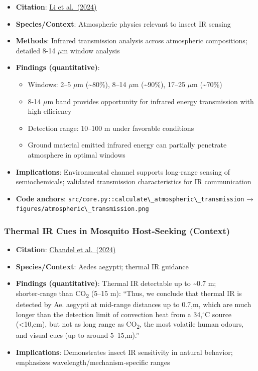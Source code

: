 \documentclass[
  13pt,
  a4paperpaper,
  12pt]{article}
\newcommand{\passthrough}[1]{#1}
\providecommand{\tightlist}{%
  \setlength{\itemsep}{0pt}\setlength{\parskip}{0pt}}
\begin{document}
\begin{itemize}
\tightlist
\item
  \textbf{Citation}:
  \href{https://pmc.ncbi.nlm.nih.gov/articles/PMC11193785/}{Li et
  al.~(2024)}
\item
  \textbf{Species/Context}: Atmospheric physics relevant to insect IR
  sensing
\item
  \textbf{Methods}: Infrared transmission analysis across atmospheric
  compositions; detailed 8-14 \(\mu\mathrm{m}\) window analysis
\item
  \textbf{Findings (quantitative)}:

  \begin{itemize}
  \tightlist
  \item
    Windows: 2--5 \(\mu\mathrm{m}\) (\textasciitilde80\%), 8--14
    \(\mu\mathrm{m}\) (\textasciitilde90\%), 17--25 \(\mu\mathrm{m}\)
    (\textasciitilde70\%)
  \item
    8-14 \(\mu\mathrm{m}\) band provides opportunity for infrared energy
    transmission with high efficiency
  \item
    Detection range: 10--100 m under favorable conditions
  \item
    Ground material emitted infrared energy can partially penetrate
    atmosphere in optimal windows
  \end{itemize}
\item
  \textbf{Implications}: Environmental channel supports long‑range
  sensing of semiochemicals; validated transmission characteristics for
  IR communication
\item
  \textbf{Code anchors}:
  \passthrough{\lstinline!src/core.py::calculate\_atmospheric\_transmission!}
  →
  \passthrough{\lstinline!figures/atmospheric\_transmission.png!}
\end{itemize}

\subsubsection{Thermal IR Cues in Mosquito Host‑Seeking
(Context)}\label{thermal-ir-cues-in-mosquito-hostseeking-context}

\begin{itemize}
\tightlist
\item
  \textbf{Citation}:
  \href{https://www.nature.com/articles/s41586-024-07848-5}{Chandel et
  al.~(2024)}
\item
  \textbf{Species/Context}: Aedes aegypti; thermal IR guidance
\item
  \textbf{Findings (quantitative)}: Thermal IR detectable up to
  \textasciitilde0.7 m; shorter‑range than CO\textsubscript{2} (5--15
  m): ``Thus, we conclude that thermal IR is detected by Ae. aegypti at
  mid-range distances up to 0.7,m, which are much longer than the
  detection limit of convection heat from a 34,\(^{\circ}\mathrm{C}\)
  source (\textless10,cm), but not as long range as CO\textsubscript{2},
  the most volatile human odours, and visual cues (up to around
  5--15,m).''
\item
  \textbf{Implications}: Demonstrates insect IR sensitivity in natural
  behavior; emphasizes wavelength/mechanism‑specific ranges
\end{itemize}
\end{document}
